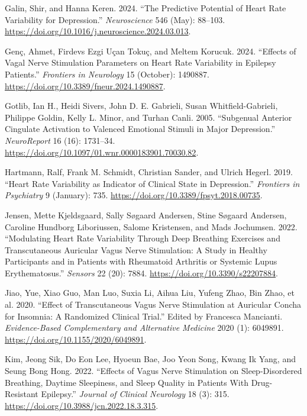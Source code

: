 \documentclass[
  Letterpaper,
]{scrbook}
\newlength{\cslhangindent}
\newenvironment{CSLReferences}[2] %
 {\begin{list}{}{%
  \setlength{\itemindent}{0pt}
  \setlength{\leftmargin}{0pt}
  \setlength{\parsep}{0pt}
  \ifodd #1
   \setlength{\leftmargin}{\cslhangindent}
   \setlength{\itemindent}{-1\cslhangindent}
  \fi
  \setlength{\itemsep}{#2\baselineskip}}}
 {\end{list}}
\begin{document}
\begin{CSLReferences}{1}{0}
Galin, Shir, and Hanna Keren. 2024. {``The {Predictive Potential} of
{Heart Rate Variability} for {Depression}.''} \emph{Neuroscience} 546
(May): 88--103.
\url{https://doi.org/10.1016/j.neuroscience.2024.03.013}.

Genç, Ahmet, Firdevs Ezgi Uçan Tokuç, and Meltem Korucuk. 2024.
{``Effects of Vagal Nerve Stimulation Parameters on Heart Rate
Variability in Epilepsy Patients.''} \emph{Frontiers in Neurology} 15
(October): 1490887. \url{https://doi.org/10.3389/fneur.2024.1490887}.

Gotlib, Ian H., Heidi Sivers, John D. E. Gabrieli, Susan
Whitfield-Gabrieli, Philippe Goldin, Kelly L. Minor, and Turhan Canli.
2005. {``Subgenual Anterior Cingulate Activation to Valenced Emotional
Stimuli in Major Depression.''} \emph{NeuroReport} 16 (16): 1731--34.
\url{https://doi.org/10.1097/01.wnr.0000183901.70030.82}.

Hartmann, Ralf, Frank M. Schmidt, Christian Sander, and Ulrich Hegerl.
2019. {``Heart {Rate Variability} as {Indicator} of {Clinical State} in
{Depression}.''} \emph{Frontiers in Psychiatry} 9 (January): 735.
\url{https://doi.org/10.3389/fpsyt.2018.00735}.

Jensen, Mette Kjeldsgaard, Sally Søgaard Andersen, Stine Søgaard
Andersen, Caroline Hundborg Liboriussen, Salome Kristensen, and Mads
Jochumsen. 2022. {``Modulating {Heart Rate Variability} Through {Deep
Breathing Exercises} and {Transcutaneous Auricular Vagus Nerve
Stimulation}: {A Study} in {Healthy Participants} and in {Patients} with
{Rheumatoid Arthritis} or {Systemic Lupus Erythematosus}.''}
\emph{Sensors} 22 (20): 7884. \url{https://doi.org/10.3390/s22207884}.

Jiao, Yue, Xiao Guo, Man Luo, Suxia Li, Aihua Liu, Yufeng Zhao, Bin
Zhao, et al. 2020. {``Effect of {Transcutaneous Vagus Nerve Stimulation}
at {Auricular Concha} for {Insomnia}: {A Randomized Clinical Trial}.''}
Edited by Francesca Mancianti. \emph{Evidence-Based Complementary and
Alternative Medicine} 2020 (1): 6049891.
\url{https://doi.org/10.1155/2020/6049891}.

Kim, Jeong Sik, Do Eon Lee, Hyoeun Bae, Joo Yeon Song, Kwang Ik Yang,
and Seung Bong Hong. 2022. {``Effects of {Vagus Nerve Stimulation} on
{Sleep-Disordered Breathing}, {Daytime Sleepiness}, and {Sleep Quality}
in {Patients With Drug-Resistant Epilepsy}.''} \emph{Journal of Clinical
Neurology} 18 (3): 315. \url{https://doi.org/10.3988/jcn.2022.18.3.315}.


\end{CSLReferences}
\end{document}
